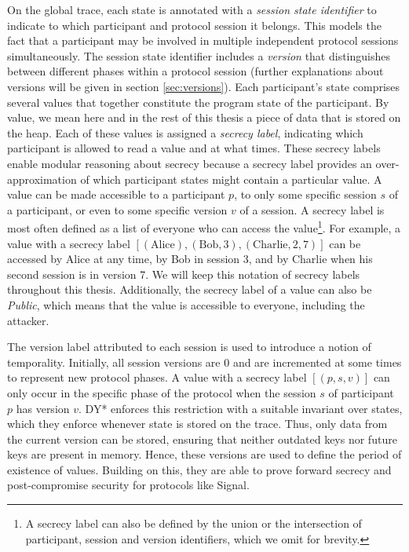 On the global trace, each state is annotated with a \emph{session state identifier} to indicate to which participant and protocol session it belongs. This models the fact that a participant may be involved in multiple independent protocol sessions simultaneously. The session state identifier includes a \emph{version} that distinguishes between different phases within a protocol session (further explanations about versions will be given in section \ref*{sec:versions}).
Each participant's state comprises several values that together constitute the program state of the participant.
By value, we mean here and in the rest of this thesis a piece of data that is stored on the heap.
Each of these values is assigned a \emph{secrecy label}, indicating which participant is allowed to read a value and at what times.
These secrecy labels enable modular reasoning about secrecy because a secrecy label provides an over-approximation of which participant states might contain a particular value.
A value can be made accessible to a participant $p$, to only some specific session $s$ of a participant, or even to some specific version $v$ of a session.
A secrecy label is most often defined as a list of everyone who can access the value\footnote{A secrecy label can also be defined by the union or the intersection of participant, session and version identifiers, which we omit for brevity.}. For example, a value with a secrecy label $[(\text{Alice}), (\text{Bob}, 3), (\text{Charlie}, 2, 7)]$ can be accessed by Alice at any time, by Bob in session 3, and by Charlie when his second session is in version 7. We will keep this notation of secrecy labels throughout this thesis.
Additionally, the secrecy label of a value can also be \emph{Public}, which means that the value is accessible to everyone, including the attacker.

The version label attributed to each session is used to introduce a notion of temporality. Initially, all session versions are 0 and are incremented at some times to represent new protocol phases.
A value with a secrecy label $[(p,s,v)]$ can only occur in the specific phase of the protocol when the session $s$ of participant $p$ has version $v$.
DY* enforces this restriction with a suitable invariant over states, which they enforce whenever state is stored on the trace. Thus, only data from the current version can be stored, ensuring that neither outdated keys nor future keys are present in memory.
Hence, these versions are used to define the period of existence of values.
Building on this, they are able to prove forward secrecy and post-compromise security for protocols like Signal.

